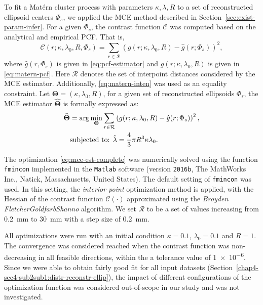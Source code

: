 \documentclass[journal]{IEEEtran}
\begin{document}
To fit a Mat\'ern cluster process with parameters $\kappa, \lambda, R$
to a set of reconstructed ellipsoid centers $\Phi_s$, we applied the
MCE method described in Section~\ref{sec:exist-param-infer}. For a
given $\Phi_s$, the contrast function $\mathcal{C}$ was computed based
on the analytical and empirical PCF. That is,
\begin{equation}
  \label{eq:matern-contrast}
  \mathcal{C}(r; \kappa, \lambda_0, R, \Phi_s) =
  \sum_{r \in \mathcal{R}} (g(r; \kappa, \lambda_0, R) -
  \hat{g}(r; \Phi_s))^2,
\end{equation}
where $\hat{g}(r, \Phi_s)$ is given in \eqref{eq:pcf-estimator} and
$g(r; \kappa, \lambda_0, R)$ is given in \eqref{eq:matern-pcf}. Here
$\mathcal{R}$ denotes the set of interpoint distances considered by
the MCE estimator. Additionally, \eqref{eq:matern-inten} was used as
an equality constraint. Let
$\mathbf{\Theta} = \left( \kappa, \lambda_0, R \right)$, for a given
set of reconstructed ellipsoids $\Phi_s$, the MCE estimator
$\widehat{\mathbf{\Theta}}$ is formally expressed as:
\begin{equation}
  \label{eq:mce-est-complete}
  \begin{aligned}
    \widehat{\mathbf{\Theta}} & = \arg \min_{\mathbf{\Theta}} \sum_{r
      \in \mathcal{R}} \left( g(r; \kappa, \lambda_0, R)
      - \hat{g}(r; \Phi_s) \right)^2, \\
    & \textnormal{subjected to: } \hat{\lambda} = \frac{4}{3}\pi
    R^3\kappa \lambda_0.
  \end{aligned}
\end{equation}

The optimization \eqref{eq:mce-est-complete} was numerically solved
using the function \texttt{fmincon} implemented in the \texttt{Matlab}
software (version \texttt{2016b}, The MathWorks Inc., Natick,
Massachusetts, United States). The default setting of \texttt{fmincon}
was used. In this setting, the \textit{interior point} optimization
method is applied, with the Hessian of the contrast function
$\mathcal{C}(\cdot)$ approximated using the \textit{Broyden\textendash
  Fletcher\textendash Goldfarb\textendash Shanno} algorithm. We set
$\mathcal{R}$ to be a set of values increasing from \SI{0.2}{\mm} to
\SI{30}{\mm} with a step size of \SI{0.2}{\mm}.

All optimizations were run with an initial condition $\kappa = 0.1$,
$\lambda_0 = 0.1$ and $R = 1$. The convergence was considered reached
when the contrast function was non-decreasing in all feasible
directions, within the a tolerance value of \num{1e-6}. Since we were
able to obtain fairly good fit for all input datasets
(Section~\ref{chap4-sec4-sub2sub1:distr-reconstr-ellip}), the impact
of different configurations of the optimization function was
considered out-of-scope in our study and was not investigated.
\end{document}
